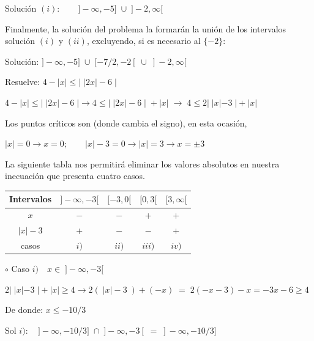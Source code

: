\begin{proofw}
 			 Solución $(i):\qquad ]-\infty,-5]\;  \cup \;  ]-2,\infty[$
 			
 			 Finalmente, la solución del problema la formarán la unión de los intervalos solución $(i)$ y $(ii)$, excluyendo, si es necesario al $\{ -2 \}$:
 			
 			 Solución:  $]-\infty, -5] \; \cup\;  [-7/2, -2[ \; \cup\;  ]-2, \infty[$
 			
		\end{proofw}
		
		
		
		\begin{ejre}
			 Resuelve: $4-|x|\le \left|\;  |2x| -6 \;   \right|$	 
		\end{ejre}
		
		\begin{proofw}\renewcommand{\qedsymbol}{$\diamond$}
				
				$4-|x|\le \left|\;  |2x| -6 \;   \right| \to 4\le \left|\;  |2x| -6 \;   \right|\; +|x|\; \to \; 4 \le 2|\;|x|-3 \; | +|x|$	
				
				\vspace{2mm} Los puntos críticos son (donde cambia el signo), en esta ocasión, 
				
				$|x|=0\to x=0; \qquad |x|-3=0 \to |x|=3 \to x=\pm 3$
				
				La siguiente tabla nos permitirá eliminar los valores absolutos en nuestra inecuación que presenta cuatro casos.
				
				
		\begin{table}[H]
		\centering
		\begin{tabular}{|c|c|c|c|c|}
		\hline
		 	Intervalos& $]-\infty, -3[$ & $[-3,0[$ & $[0,3[$ & $[3,\infty[$ \\ \hline
		 	$x$& $-$ & $-$ & + & + \\ \hline
		 	$|x|-3$& + & $-$ & $-$ & + \\ \hline
		 	casos& $i)$ & $ii)$ & $iii)$ & $iv)$ \\ \hline
		\end{tabular}
		\end{table}
			
			 $\circ$ Caso $i)\quad x\in \; ]-\infty,-3[$	
			
			$ 2|\;|x|-3 \; | +|x| \ge 4 \to 2 (\; |x|-3 \; )+(-x)\; = \; 2(-x-3)-x=-3x-6\ge 4$ 
			
			De donde: $x\le -10/3$
			
			\hspace{10mm}Sol $i):\quad ]-\infty,-10/3] \; \cap\;  ]-\infty,-3[ \; = \; ]-\infty,-10/3]$
			

\end{proofw}
